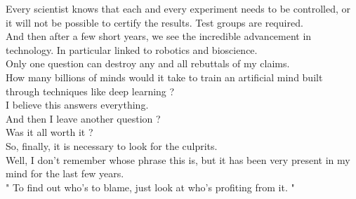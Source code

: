 \documentclass{book}
\begin{document}
Every scientist knows that each and every experiment needs to be controlled, or it will not be possible to certify the results. Test groups are required. \\

And then after a few short years, we see the incredible advancement in technology. In particular linked to robotics and bioscience. \\

Only one question can destroy any and all rebuttals of my claims. \\

How many billions of minds would it take to train an artificial mind built through techniques like deep learning ? \\

I believe this answers everything. \\

And then I leave another question ? \\

Was it all worth it ? \\

So, finally, it is necessary to look for the culprits.\\ 


Well, I don't remember whose phrase this is, but it has been very present in my mind for the last few years. \\


\center " To find out who's to blame, just look at who's profiting from it. "
\end{document}
